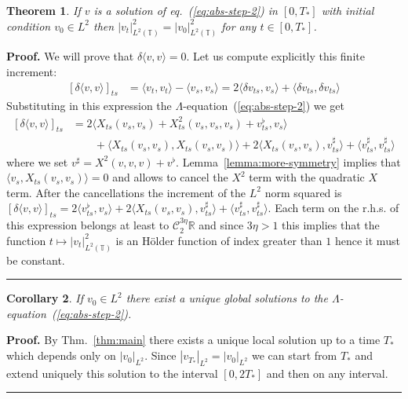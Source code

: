\documentclass[a4paper,11pt,reqno]{article}
\newcommand{\der}{\delta}
\newcommand{\RR}{\mathbb{R}}
\newcommand{\TT}{\mathbb{T}}
\newcommand{\CC}{\mathcal{C}}
\newtheorem{theorem}{Theorem}
\newtheorem{corollary}[theorem]{Corollary}
\newenvironment{proof}[1][Proof]{\textbf{#1.} }{\ \rule{0.5em}{0.5em}}
\begin{document}
\begin{theorem}%
If $v$ is a solution of eq.~(\ref{eq:abs-step-2}) in $[0,T_*]$ with initial condition $v_0 \in L^2$ then $|v_t|^2_{L^2(\TT)} = |v_0|^2_{L^2(\TT)}$ for any $t \in [0,T_*]$.
\end{theorem}
\begin{proof}
We will prove that $\der \langle v,v \rangle  = 0$. Let us compute explicitly this finite increment:
\begin{equation*}
  \begin{split}
[\der \langle v,v \rangle]_{ts}  & = \langle v_t,v_t \rangle - \langle v_s,v_s \rangle
=  2 \langle \der v_{ts},v_s \rangle + \langle \der v_{ts},\der v_{ts} \rangle    
  \end{split}
\end{equation*}
Substituting in this expression the $\Lambda$-equation~(\ref{eq:abs-step-2}) we get
\begin{equation*}
  \begin{split}
[\der \langle v,v \rangle]_{ts}
& = 2  \langle X_{ts}(v_s,v_s)+X^2_{ts}(v_s,v_s,v_s) + v^\flat_{ts},v_s \rangle 
\\ & \qquad + \langle X_{ts}(v_s,v_s),X_{ts}(v_s,v_s) \rangle 
+ 2 \langle X_{ts}(v_s,v_s),v^{\sharp}_{ts} \rangle    
+  \langle v^{\sharp}_{ts},v^{\sharp}_{ts} \rangle    
  \end{split}
\end{equation*}
where we set $v^\sharp = X^2(v,v,v) +
v^\flat$. Lemma~\ref{lemma:more-symmetry} implies that $\langle v_s,
X_{ts}(v_s,v_s) \rangle = 0$ and
allows to cancel the $X^2$ term with the quadratic $X$ term. After the
cancellations the increment of the $L^2$ norm squared is  
$[\der \langle v,v \rangle]_{ts}
 = 2  \langle  v^\flat_{ts},v_s \rangle 
+ 2 \langle X_{ts}(v_s,v_s),v^{\sharp}_{ts} \rangle    
+  \langle v^{\sharp}_{ts},v^{\sharp}_{ts} \rangle    
$. Each term  on the r.h.s. of this expression belongs at least to $\CC_2^{3\eta} \RR$ and
since $3\eta > 1$ this implies that the function $t \mapsto |v_t|^2_{L^2(\TT)}$
is an H\"older function of index greater than $1$ hence it
must be constant.
\end{proof}


\begin{corollary}%
If $v_0 \in L^2$ there exist a unique global solutions to the $\Lambda$-equation~(\ref{eq:abs-step-2}).  
\end{corollary}
\begin{proof}
By Thm.~\ref{thm:main} there exists a unique local solution up to a time
$T_*$ which depends only on $|v_0|_{L^2}$. Since $|v_{T_*}|_{L^2} = |v_{0}|_{L^2}$
we can start from $T_*$ and extend uniquely this solution to the interval
$[0,2T_*]$ and then on any interval.
\end{proof}
\end{document}
